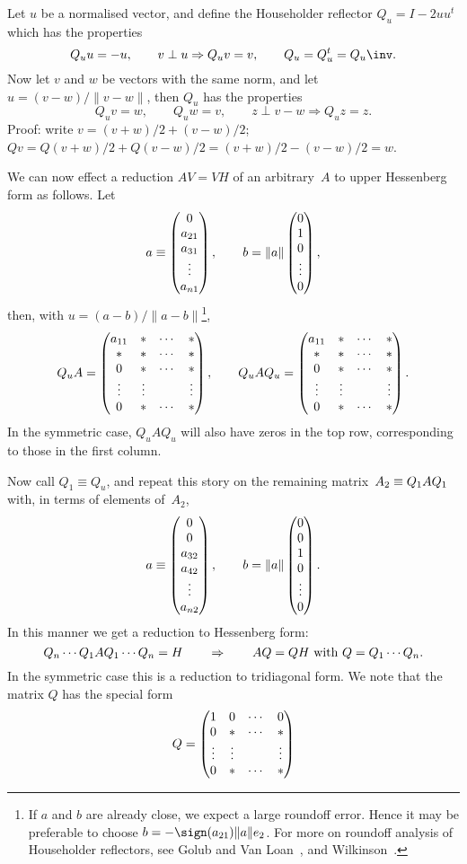 Let $u$ be a normalised vector, and define 
the Householder reflector $Q_u=I-2uu^t$ which has the properties
 \[ Q_uu=-u,\qquad v\perp u\Rightarrow Q_uv=v,\qquad Q_u=Q_u^t=Q_u\inv. \]
Now let $v$ and $w$ be vectors with the same norm, and let
$u=(v-w)/\|v-w\|$, then $Q_u$ has the properties
 \[ Q_uv=w,\qquad Q_uw=v,\qquad z\perp v-w\Rightarrow Q_uz=z. \]
Proof: write $v=(v+w)/2+(v-w)/2$; $Qv=Q(v+w)/2+Q(v-w)/2=(v+w)/2-(v-w)/2=w$.

We can now effect a reduction $AV=VH$ of an arbitrary~$A$ to
upper Hessenberg form as follows. Let 
 \[ a\equiv \begin{pmatrix}0\cr a_{21}\cr a_{31}\cr\vdots\cr a_{n1}\end{pmatrix},\qquad
    b=\|a\|\begin{pmatrix}0\cr 1\cr 0\cr \vdots\cr 0\end{pmatrix}, \]
then, with $u=(a-b)/\|a-b\|$\footnote{If $a$ and $b$ are already close,
we expect a large roundoff error. Hence it may be preferable
to choose $b=-\sign(a_{21})\|a\|e_2$. For more on roundoff analysis of
Householder reflectors, see Golub and Van Loan~\cite{GoVL:matcomp},
and Wilkinson~\cite{Wi:AEP}.},
 \[
     Q_uA=\begin{pmatrix}a_{11}&*&\cdots&*\cr *&*&\cdots&*\cr 
                  0&*&\cdots&*\cr \vdots&\vdots&&\vdots\cr 0&*&\cdots&*\cr\end{pmatrix},
    \qquad
     Q_uAQ_u=\begin{pmatrix}a_{11}&*&\cdots&*\cr *&*&\cdots&*\cr 
                  0&*&\cdots&*\cr \vdots&\vdots&&\vdots\cr 0&*&\cdots&*\cr\end{pmatrix}.
 \]
In the symmetric case, $Q_uAQ_u$ will also have zeros
in the top row, corresponding to those in the first column.

Now call $Q_1\equiv Q_u$, and repeat this story on the
remaining matrix~$A_2\equiv\nobreak Q_1AQ_1$ with, in terms of elements
of~$A_2$,
 \[ a\equiv \begin{pmatrix}0\cr 0\cr a_{32}\cr a_{42}\cr\vdots\cr a_{n2}\end{pmatrix},\qquad
    b=\|a\|\begin{pmatrix}0\cr0\cr 1\cr 0\cr \vdots\cr 0\end{pmatrix}. \]
In this manner we get a reduction to Hessenberg form:
\[ Q_n\cdots Q_1AQ_1\cdots Q_n=H \qquad\Rightarrow\qquad
  \hbox{$AQ=QH$ with $Q=Q_1\cdots Q_n$}. \]
In the symmetric case this is a reduction to tridiagonal form.
We note that the matrix $Q$ has the special form
\begin{equation}
    Q=\begin{pmatrix}1&0&\cdots&0\cr 0&*&\cdots&*\cr
    \vdots&\vdots&&\vdots\cr 0&*&\cdots&*\cr\end{pmatrix}
    \label{eq:Hess-Q-form}              
\end{equation}

